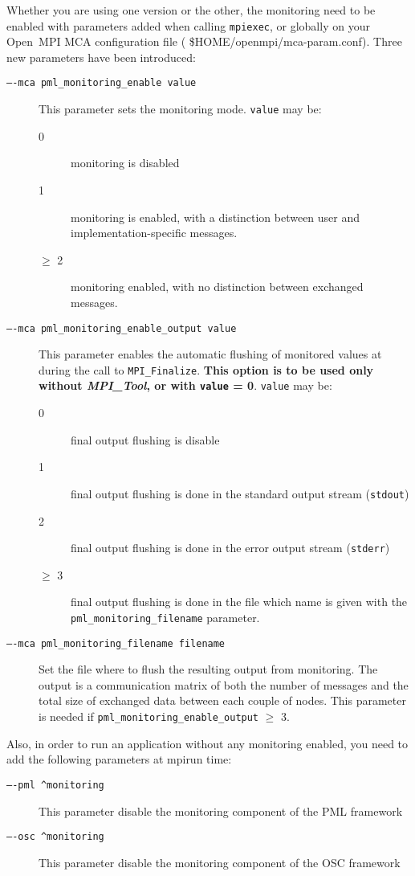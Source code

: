 \documentclass[notitlepage]{article}
\newcommand{\mpit}[1]{\textit{MPI\_Tool#1}}
\begin{document}
Whether you are using one version or the other, the monitoring need to
be enabled with parameters added when calling \texttt{mpiexec}, or globally
on your Open~MPI MCA configuration file ( \${HOME}/openmpi/mca-param.conf).
Three new parameters have been introduced:
\begin{description}
\item [\texttt{----mca pml\_monitoring\_enable value}] This parameter
  sets the monitoring mode. \texttt{value} may be:
  \begin{description}
  \item [0] monitoring is disabled
  \item [1] monitoring is enabled, with a distinction between user and
    implementation-specific messages.
  \item [$\ge$ 2] monitoring enabled, with no distinction between
    exchanged messages.
  \end{description}
\item [\texttt{----mca pml\_monitoring\_enable\_output value}] This
  parameter enables the automatic flushing of monitored values at
  during the call to \texttt{MPI\_Finalize}. {\bf This option is to be
    used only without \mpit{}, or with \texttt{value} =
    0}. \texttt{value} may be:
  \begin{description}
  \item [0] final output flushing is disable
  \item [1] final output flushing is done in the standard output stream (\texttt{stdout})
  \item [2] final output flushing is done in the error output stream (\texttt{stderr})
  \item [$\ge$ 3] final output flushing is done in the file which name
    is given with the \texttt{pml\_monitoring\_filename} parameter.
  \end{description}
\item [\texttt{----mca pml\_monitoring\_filename filename}] Set the
  file where to flush the resulting output from monitoring. The output
  is a communication matrix of both the number of messages and the
  total size of exchanged data between each couple of nodes. This
  parameter is needed if \texttt{pml\_monitoring\_enable\_output}
  $\ge$ 3.
\end{description}

Also, in order to run an application without any monitoring enabled,
you need to add the following parameters at mpirun time:
\begin{description}
\item [\texttt{----pml ^monitoring}] This parameter disable the
  monitoring component of the PML framework
  \item [\texttt{----osc ^monitoring}] This parameter disable the
    monitoring component of the OSC framework
\end{description}
\end{document}
